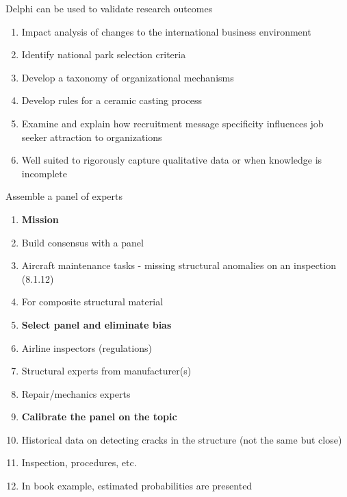 \documentclass[aspectratio=1610,pdftex,dvipsnames,compress,xcolor={dvipsnames}]{beamer}
\begin{document}
\begin{frame}{Delphi can be used to validate research outcomes}
    \begin{enumerate}[series=outerlist,topsep=0pt,itemsep=18pt,leftmargin=*,label=(\arabic*)]
        \item[]Impact analysis of changes to the international business environment
        \item[]Identify national park selection criteria
        \item[]Develop a taxonomy of organizational mechanisms
        \item[]Develop rules for a ceramic casting process
        \item[]Examine and explain how recruitment message specificity influences job seeker attraction to organizations
        \item[]Well suited to rigorously capture qualitative data or when knowledge is incomplete
    \end{enumerate}
\end{frame}


\begin{frame}{Assemble a panel of experts}
    \begin{enumerate}[series=outerlist,topsep=0pt,itemsep=1pt,leftmargin=*,label=(\arabic*)]
        \item[]\textbf{Mission}
        \item[]Build consensus with a panel
        \item[]Aircraft maintenance tasks - missing structural anomalies on an inspection (8.1.12)
        \item[]For composite structural material
            \vspace{0.05in}
        \item[]\textbf{Select panel and eliminate bias}
        \item[]Airline inspectors (regulations)  
        \item[]Structural experts from manufacturer(s)  
        \item[]Repair/mechanics experts
            \vspace{0.05in}
        \item[]\textbf{Calibrate the panel on the topic}
        \item[]Historical data on detecting cracks in the structure (not the same but close)  
        \item[]Inspection, procedures, etc.    
        \item[]In book example, estimated probabilities are presented
    \end{enumerate}
\end{frame}
\end{document}

